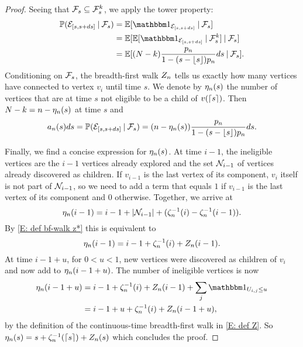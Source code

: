 \begin{proof}
	Seeing that $\mathcal{F}_s \subseteq \mathcal{F}_s^k$,
	we apply the tower property:
	\begin{equation}
	\begin{aligned}
	\Prob(\NewEdge{[s,s+ds]} \cond \SigmaAlgebra_s)
	&= \Exp{\Ind{\NewEdge{[s,s+ds]}} \cond \SigmaAlgebra_s} \\
	&= \Exp{ \Exp{\Ind{\NewEdge{[s,s+ds]}} \cond \SigmaAlgebra_s^k} \cond \SigmaAlgebra_s} \\
	&= \Exp{ (N-k) \ps ds \cond \SigmaAlgebra_s}.
	\end{aligned}
	\end{equation}
	Conditioning on $\mathcal{F}_s$,
	the breadth-first walk $Z_n$ tells us exactly how many vertices have connected to vertex $v_i$ until time $s$.
	We denote by $\eta_n(s)$ the number of vertices that are at time $s$ not eligible to be a child of $v(\lceil s\rceil)$. \label{I: eta}
	Then $N-k=n-\eta_n(s)$ at time $s$ and
	\begin{equation}
	a_n(s)ds = \mathbb{P}(\mathcal{E}_{[s, s+ds]} \: | \: \mathcal{F}_s) = (n - \eta_n(s)) \frac{p_n}{1-(s-\lfloor s\rfloor)p_n} ds.
	\end{equation}
	
	\bigskip
	
	Finally, we find a concise expression for $\eta_n(s)$.
	At time $i-1$, the ineligible vertices are the $i-1$ vertices already explored
	and the set $\mathcal{N}_{i-1}$ of vertices already discovered as children.
	If $v_{i-1}$ is the last vertex of its component,
	$v_i$ itself is not part of $\mathcal{N}_{i-1}$, 
	so we need to add a term that equals $1$ if $v_{i-1}$ is the last vertex of its component and $0$ otherwise.
	Together, we arrive at
	\begin{equation}
	\eta_n(i-1) = i-1 + |\mathcal{N}_{i-1}| + (\zeta^{-1}_n(i) - \zeta^{-1}_n(i-1)).
	\end{equation}
	By \eqref{E: def bf-walk z*} this is equivalent to
	\begin{equation}
	\eta_n(i-1) = i-1 + \zeta^{-1}_n(i) + Z_n(i-1).
	\end{equation}
	At time $i-1+u$, for $0<u<1$, 
	new vertices were discovered as children of $v_i$ and now add to $\eta_n(i-1+u)$.
	The number of ineligible vertices is now
	\begin{equation}
	\begin{aligned}
	\Ineligible{i-1+u} 
	&= i-1 + \ZetaMinus{i} + \Zn(i-1) + \sum_{j} \Ind{\Uij \leq u} \\
	&= i-1+u + \ZetaMinus{i} + \Zn(i-1+u),
	\end{aligned}
	\end{equation} 
	by the definition of the continuous-time breadth-first walk in \eqref{E: def Z}.
	So $\eta_n(s) = s + \zeta^{-1}_n(\lceil s\rceil) + Z_n(s)$ which concludes the proof.
\end{proof}

